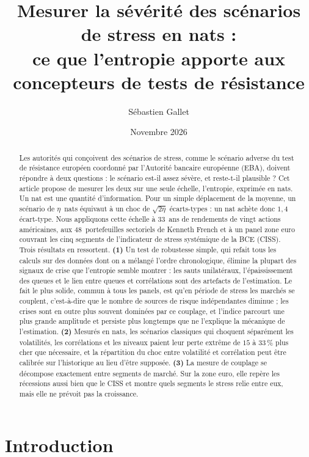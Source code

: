 \documentclass[11pt]{article}
\title{Mesurer la sévérité des scénarios de stress en nats :\\
ce que l'entropie apporte aux concepteurs de tests de résistance}
\author{Sébastien Gallet}
\date{Novembre 2026}
\theoremstyle{definition}
\begin{document}
\maketitle

\begin{abstract}
\noindent Les autorités qui conçoivent des scénarios de stress, comme le
scénario adverse du test de résistance européen coordonné par l'Autorité
bancaire européenne (EBA), doivent répondre à deux questions : le scénario
est-il assez sévère, et reste-t-il plausible ? Cet article propose de mesurer
les deux sur une seule échelle, l'entropie, exprimée en nats. Un nat est une
quantité d'information. Pour un simple déplacement de la moyenne, un scénario
de $\eta$~nats équivaut à un choc de $\sqrt{2\eta}$ écarts-types : un nat
achète donc $1{,}4$ écart-type. Nous appliquons cette échelle à 33~ans de
rendements de vingt actions américaines, aux 48~portefeuilles sectoriels de
Kenneth French et à un panel zone euro couvrant les cinq segments de
l'indicateur de stress systémique de la BCE (CISS). Trois résultats en
ressortent. \textbf{(1)} Un test de robustesse simple, qui refait tous les
calculs sur des données dont on a mélangé l'ordre chronologique, élimine la
plupart des signaux de crise que l'entropie semble montrer : les sauts
unilatéraux, l'épaississement des queues et le lien entre queues et
corrélations sont des artefacts de l'estimation. Le fait le plus solide,
commun à tous les panels, est qu'en période de stress les marchés se couplent,
c'est-à-dire que le nombre de sources de risque indépendantes diminue ; les
crises sont en outre plus souvent dominées par ce couplage, et l'indice
parcourt une plus grande amplitude et persiste plus longtemps que ne
l'explique la mécanique de l'estimation. \textbf{(2)} Mesurés en nats, les
scénarios classiques qui choquent séparément les volatilités, les
corrélations et les niveaux paient leur perte extrême de $15$ à $33\,\%$ plus
cher que nécessaire, et la répartition du choc entre volatilité et
corrélation peut être calibrée sur l'historique au lieu d'être supposée.
\textbf{(3)} La mesure de couplage se décompose exactement entre segments de
marché. Sur la zone euro, elle repère les récessions aussi bien que le CISS
et montre quels segments le stress relie entre eux, mais elle ne prévoit pas
la croissance.
\end{abstract}


\section{Introduction}
\label{sec:intro}
\end{document}
